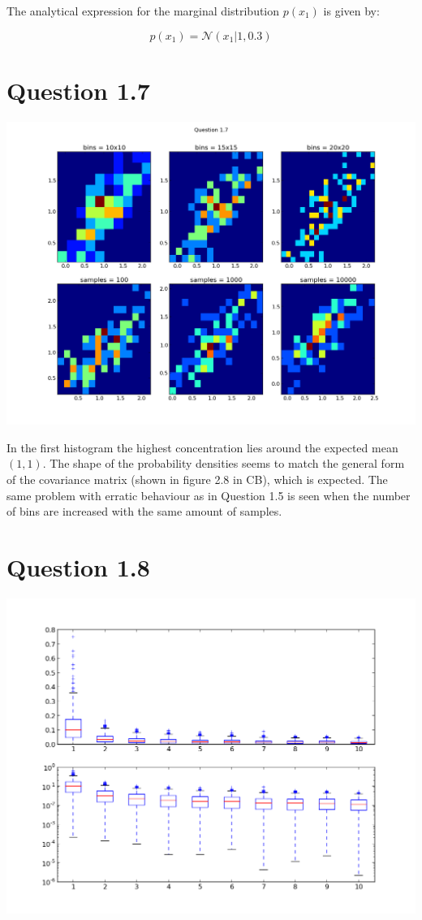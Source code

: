 \documentclass[11pt,a4paper]{article}
\begin{document}
The analytical expression for the marginal distribution $p(x_1)$ is given by:

$$ p(x_1) = \mathcal{N}(x_1 | 1, 0.3) $$

\section{Question 1.7}
\includegraphics[width=1.1\textwidth]{figure_5.png}

In the first histogram the highest concentration lies around the expected mean $(1,1)$.
The shape of the probability densities seems to match the general form of the covariance
matrix (shown in figure 2.8 in CB), which is expected. The same problem with erratic
behaviour as in Question 1.5 is seen when the number of bins are increased with the same
amount of samples.

\section{Question 1.8}
\includegraphics[width=1.1\textwidth]{figure_6.png}
\end{document}
